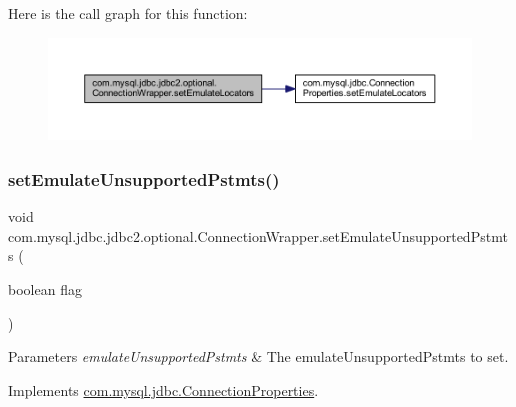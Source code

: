 Here is the call graph for this function\+:
\nopagebreak
\begin{figure}[H]
\begin{center}
\leavevmode
\includegraphics[width=350pt]{classcom_1_1mysql_1_1jdbc_1_1jdbc2_1_1optional_1_1_connection_wrapper_aa54e4168297c0975cb337fd18c989eac_cgraph}
\end{center}
\end{figure}
\mbox{\label{classcom_1_1mysql_1_1jdbc_1_1jdbc2_1_1optional_1_1_connection_wrapper_a44f6dda9f93deaa617804ab20b7790d1}} 
\subsubsection{\texorpdfstring{set\+Emulate\+Unsupported\+Pstmts()}{setEmulateUnsupportedPstmts()}}
{\footnotesize\ttfamily void com.\+mysql.\+jdbc.\+jdbc2.\+optional.\+Connection\+Wrapper.\+set\+Emulate\+Unsupported\+Pstmts (\begin{DoxyParamCaption}\item[{boolean}]{flag }\end{DoxyParamCaption})}


\begin{DoxyParams}{Parameters}
{\em emulate\+Unsupported\+Pstmts} & The emulate\+Unsupported\+Pstmts to set. \\
\hline
\end{DoxyParams}


Implements \mbox{\hyperlink{interfacecom_1_1mysql_1_1jdbc_1_1_connection_properties_ad1ece011a4fffaed971f9849aa966183}{com.\+mysql.\+jdbc.\+Connection\+Properties}}.

